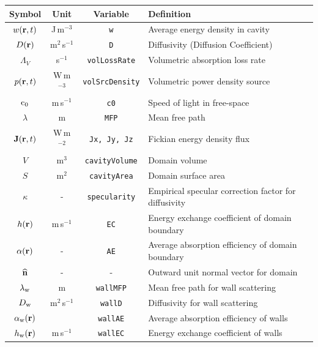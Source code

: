 \documentclass[a4paper]{article}
\numberwithin{equation}{section}
\begin{document}
\begin{center}
\begin{supertabular}{|c|c|c|l|}
\hline
\textbf{Symbol}     &\textbf{Unit}   &\textbf{Variable}           &\textbf{Definition} \\
\hline
$w(\boldsymbol{\mathrm{r}},t)$             &J\,m$^{-3}$     &\texttt{w}                  &Average energy density in cavity \\
$D(\boldsymbol{\mathrm{r}})$              &m$^2$\,s$^{-1}$ &\texttt{D}                  &Diffusivity (Diffusion Coefficient) \\
$\Lambda _V$        &s$^{-1}$        &\texttt{volLossRate}        &Volumetric absorption loss rate \\
$p(\boldsymbol{\mathrm{r}},t)$             &W\,m$^{-3}$     &\texttt{volSrcDensity}      &Volumetric power density source \\
$\mathrm{c}_0$             &m\,s$^{-1}$     &\texttt{c0}                 &Speed of light in free-space \\
$\lambda$           &m               &\texttt{MFP}                &Mean free path \\
$\boldsymbol{\mathrm{J}}(\boldsymbol{\mathrm{r}},t)$           &W\,m$^{-2}$     &\texttt{Jx, Jy, Jz}         &Fickian energy density flux \\
$V$                 &m$^3$           &\texttt{cavityVolume}       &Domain volume \\
$S$                 &m$^2$           &\texttt{cavityArea}         &Domain surface area \\
$\kappa$            &-               &\texttt{specularity}        &Empirical specular correction factor for diffusivity \\
$h(\boldsymbol{\mathrm{r}})$              &m\,s$^{-1}$     &\texttt{EC}                 &Energy exchange coefficient of domain boundary \\
$\alpha(\boldsymbol{\mathrm{r}})$         &-               &\texttt{AE}                 &Average absorption efficiency of domain boundary \\
$\widehat{\boldsymbol{\mathrm{n}}}$              &-               &-                           &Outward unit normal vector for domain \\
$\lambda_{\mathrm{w}}$       &m               &\texttt{wallMFP}            &Mean free path for wall scattering \\
$D_{\mathrm{w}}$             &m$^2$\,s$^{-1}$ &\texttt{wallD}              &Diffusivity for wall scattering \\
$\alpha_{\mathrm{w}}(\boldsymbol{\mathrm{r}})$     &~               &\texttt{wallAE}             &Average absorption efficiency of walls \\
$h_{\mathrm{w}}(\boldsymbol{\mathrm{r}})$          &m\,s$^{-1}$     &\texttt{wallEC}             &Energy exchange coefficient of walls \\

\end{supertabular}
\end{center}
\end{document}
